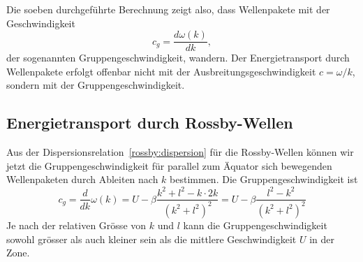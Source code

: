 Die soeben durchgeführte Berechnung zeigt also, dass Wellenpakete
mit der Geschwindigkeit 
\[
c_g=\frac{d\omega(k)}{dk},
\]
der sogenannten Gruppengeschwindigkeit, wandern.
Der Energietransport durch Wellenpakete erfolgt offenbar nicht
mit der Ausbreitungsgeschwindigkeit $c=\omega/k$, sondern mit der
Gruppengeschwindigkeit.

\subsection{Energietransport durch Rossby-Wellen\label{rossby:transport}}
Aus der Dispersionsrelation~\eqref{rossby:dispersion}
für die Rossby-Wellen können wir jetzt die Gruppengeschwindigkeit
für parallel zum Äquator sich bewegenden Wellenpaketen
durch Ableiten nach $k$ bestimmen.
Die Gruppengeschwindigkeit ist
\begin{equation}
c_g
=
\frac{d}{dk}\omega(k)
=
U-\beta
\frac{k^2+l^2-k\cdot 2k}{(k^2+l^2)^2}
=
U-\beta
\frac{l^2-k^2}{(k^2+l^2)^2}
\end{equation}
Je nach der relativen Grösse von $k$ und $l$ kann die
Gruppengeschwindigkeit sowohl grösser als auch kleiner sein als die
mittlere Geschwindigkeit $U$ in der Zone.








